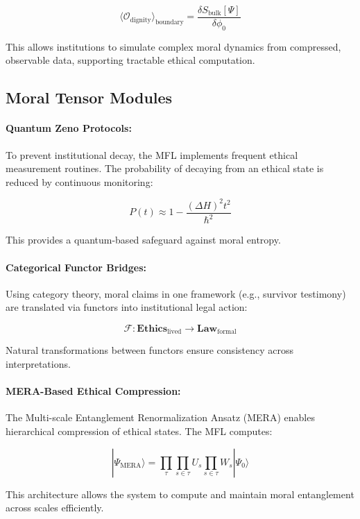 \documentclass{article}
\theoremstyle{plain}
\theoremstyle{claimstyle}
\begin{document}
\[
\langle \mathcal{O}_{\text{dignity}} \rangle_{\text{boundary}} = \frac{\delta S_{\text{bulk}}[\Psi]}{\delta \phi_0}
\]

This allows institutions to simulate complex moral dynamics from compressed, observable data, supporting tractable ethical computation.

\subsection{Moral Tensor Modules}

\paragraph{Quantum Zeno Protocols:}

To prevent institutional decay, the MFL implements frequent ethical measurement routines. The probability of decaying from an ethical state is reduced by continuous monitoring:

\[
P(t) \approx 1 - \frac{(\Delta H)^2 t^2}{\hbar^2}
\]

This provides a quantum-based safeguard against moral entropy.

\paragraph{Categorical Functor Bridges:}

Using category theory, moral claims in one framework (e.g., survivor testimony) are translated via functors into institutional legal action:

\[
\mathcal{F}: \mathbf{Ethics}_{\text{lived}} \rightarrow \mathbf{Law}_{\text{formal}}
\]

Natural transformations between functors ensure consistency across interpretations.

\paragraph{MERA-Based Ethical Compression:}

The Multi-scale Entanglement Renormalization Ansatz (MERA) enables hierarchical compression of ethical states. The MFL computes:

\[
|\Psi_{\text{MERA}}\rangle = \prod_{\tau}\prod_{s\in\tau}U_s \prod_{s\in\tau}W_s|\Psi_0\rangle
\]

This architecture allows the system to compute and maintain moral entanglement across scales efficiently.
\end{document}

